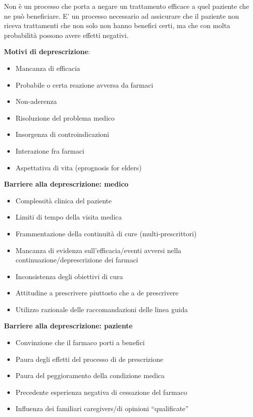   Non è un processo che porta a negare un trattamento efficace a quel
  paziente che ne può beneficiare. E' un processo necessario ad
  assicurare che il paziente non riceva trattamenti che non solo non
  hanno benefici certi, ma che con molta probabilità possono avere
  effetti negativi.

  \textbf{Motivi di deprescrizione}:

\begin{itemize}
\item
  Mancanza di efficacia
\item
  Probabile o certa reazione avversa da farmaci
\item
  Non-aderenza
\item
  Risoluzione del problema medico
\item
  Insorgenza di controindicazioni
\item
  Interazione fra farmaci
\item
  Aspettativa di vita (eprognosis for elders)
\end{itemize}

  \textbf{Barriere alla deprescrizione: medico}

\begin{itemize}
\item
  Complessità clinica del paziente
\item
  Limiti di tempo della visita medica
\item
  Frammentazione della continuità di cure (multi-prescrittori)
\item
  Mancanza di evidenza sull'efficacia/eventi avversi nella
  continuazione/deprescrizione dei farmaci
\item
  Inconsistenza degli obiettivi di cura
\item
  Attitudine a prescrivere piuttosto che a de prescrivere
\item
  Utilizzo razionale delle raccomandazioni delle linea guida
\end{itemize}
  
  \textbf{Barriere alla deprescrizione: paziente}

\begin{itemize}
\item
  Convinzione che il farmaco porti a benefici
\item
  Paura degli effetti del processo di de prescrizione
\item
  Paura del peggioramento della condizione medica
\item
  Precedente esperienza negativa di cessazione del farmaco
\item
  Influenza dei familiari caregivers/di opinioni ``qualificate''
\end{itemize}

